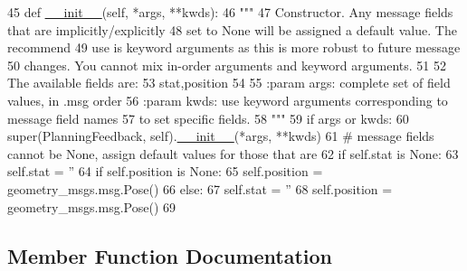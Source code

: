 \begin{DoxyCode}
45   \textcolor{keyword}{def }\hyperlink{classstate__machine_1_1Play_a5993a23d8be7f7b2647f71ede0334957}{\_\_init\_\_}(self, *args, **kwds):
46     \textcolor{stringliteral}{"""}
47 \textcolor{stringliteral}{    Constructor. Any message fields that are implicitly/explicitly}
48 \textcolor{stringliteral}{    set to None will be assigned a default value. The recommend}
49 \textcolor{stringliteral}{    use is keyword arguments as this is more robust to future message}
50 \textcolor{stringliteral}{    changes.  You cannot mix in-order arguments and keyword arguments.}
51 \textcolor{stringliteral}{}
52 \textcolor{stringliteral}{    The available fields are:}
53 \textcolor{stringliteral}{       stat,position}
54 \textcolor{stringliteral}{}
55 \textcolor{stringliteral}{    :param args: complete set of field values, in .msg order}
56 \textcolor{stringliteral}{    :param kwds: use keyword arguments corresponding to message field names}
57 \textcolor{stringliteral}{    to set specific fields.}
58 \textcolor{stringliteral}{    """}
59     \textcolor{keywordflow}{if} args \textcolor{keywordflow}{or} kwds:
60       super(PlanningFeedback, self).\hyperlink{classstate__machine_1_1Play_a5993a23d8be7f7b2647f71ede0334957}{\_\_init\_\_}(*args, **kwds)
61       \textcolor{comment}{# message fields cannot be None, assign default values for those that are}
62       \textcolor{keywordflow}{if} self.stat \textcolor{keywordflow}{is} \textcolor{keywordtype}{None}:
63         self.stat = \textcolor{stringliteral}{''}
64       \textcolor{keywordflow}{if} self.position \textcolor{keywordflow}{is} \textcolor{keywordtype}{None}:
65         self.position = geometry\_msgs.msg.Pose()
66     \textcolor{keywordflow}{else}:
67       self.stat = \textcolor{stringliteral}{''}
68       self.position = geometry\_msgs.msg.Pose()
69 
\end{DoxyCode}


\subsection{Member Function Documentation}
\mbox{\label{classexp__assignment2_1_1msg_1_1__PlanningFeedback_1_1PlanningFeedback_ad8e457e0a3102fe79cddca08c457c62f}} 
